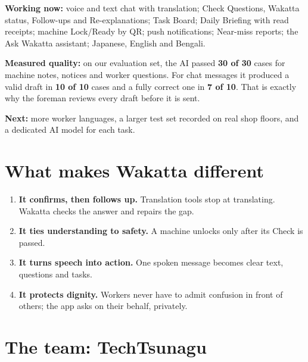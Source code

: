 \documentclass[11pt,a4paper]{article}
\begin{document}
\textbf{Working now:} voice and text chat with translation; Check Questions, Wakatta status, Follow-ups and Re-explanations; Task Board; Daily Briefing with read receipts; machine Lock/Ready by QR; push notifications; Near-miss reports; the Ask Wakatta assistant; Japanese, English and Bengali.

\textbf{Measured quality:} on our evaluation set, the AI passed \textbf{30 of 30} cases for machine notes, notices and worker questions. For chat messages it produced a valid draft in \textbf{10 of 10} cases and a fully correct one in \textbf{7 of 10}. That is exactly why the foreman reviews every draft before it is sent.

\textbf{Next:} more worker languages, a larger test set recorded on real shop floors, and a dedicated AI model for each task.

\section{What makes Wakatta different}

\begin{enumerate}
  \item \textbf{It confirms, then follows up.} Translation tools stop at translating. Wakatta checks the answer and repairs the gap.
  \item \textbf{It ties understanding to safety.} A machine unlocks only after its Check is passed.
  \item \textbf{It turns speech into action.} One spoken message becomes clear text, questions and tasks.
  \item \textbf{It protects dignity.} Workers never have to admit confusion in front of others; the app asks on their behalf, privately.
\end{enumerate}

\section{The team: TechTsunagu}
\end{document}
